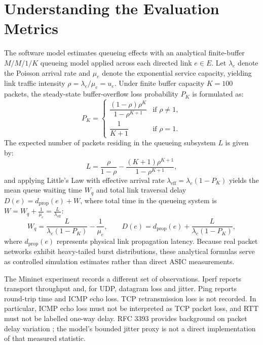\documentclass[12pt,a4paper,oneside]{report}
\let\cite\citep
\begin{document}
\section{Understanding the Evaluation Metrics}
The software model estimates queueing effects with an analytical finite-buffer $M/M/1/K$ queueing model applied across each directed link $e \in E$. Let $\lambda_e$ denote the Poisson arrival rate and $\mu_e$ denote the exponential service capacity, yielding link traffic intensity $\rho = \lambda_e / \mu_e = u_e$. Under finite buffer capacity $K = 100$ packets, the steady-state buffer-overflow loss probability $P_K$ is formulated as:
\begin{equation}
\label{eq:mm1k_loss}
P_K = \begin{cases} \dfrac{(1 - \rho)\rho^K}{1 - \rho^{K+1}} & \text{if } \rho \neq 1, \\[2mm] \dfrac{1}{K+1} & \text{if } \rho = 1. \end{cases}
\end{equation}
The expected number of packets residing in the queueing subsystem $L$ is given by:
\begin{equation}
\label{eq:mm1k_length}
L = \frac{\rho}{1 - \rho} - \frac{(K+1)\rho^{K+1}}{1 - \rho^{K+1}},
\end{equation}
and applying Little's Law with effective arrival rate $\lambda_{\text{eff}} = \lambda_e(1 - P_K)$ yields the mean queue waiting time $W_q$ and total link traversal delay $D(e) = d_{\text{prop}}(e) + W$, where total time in the queueing system is $W = W_q + \frac{1}{\mu_e} = \frac{L}{\lambda_{\text{eff}}}$:
\begin{equation}
\label{eq:mm1k_waiting}
W_q = \frac{L}{\lambda_e(1 - P_K)} - \frac{1}{\mu_e}, \qquad D(e) = d_{\text{prop}}(e) + \frac{L}{\lambda_e(1 - P_K)},
\end{equation}
where $d_{\text{prop}}(e)$ represents physical link propagation latency. Because real packet networks exhibit heavy-tailed burst distributions, these analytical formulas serve as controlled simulation estimates rather than direct ASIC measurements.

The Mininet experiment records a different set of observations. Iperf reports transport throughput and, for UDP, datagram loss and jitter. Ping reports round-trip time and ICMP echo loss. TCP retransmission loss is not recorded. In particular, ICMP echo loss must not be interpreted as TCP packet loss, and RTT must not be labelled one-way delay. RFC 3393 provides background on packet delay variation \cite{rfc3393}; the model's bounded jitter proxy is not a direct implementation of that measured statistic.
\end{document}
